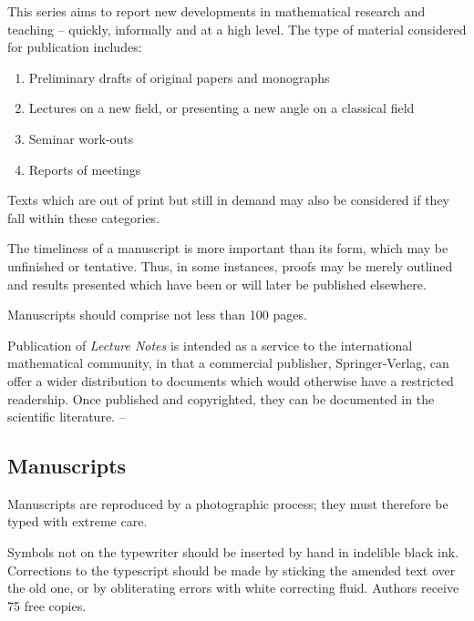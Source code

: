 
This series aims to report new developments in mathematical research and teaching -- quickly, informally
and at a high level. The type of material considered for publication includes:
\begin{enumerate}
\item Preliminary drafts of original papers and monographs
\item Lectures on a new field, or presenting a new angle on a classical field
\item Seminar work-outs
\item Reports of meetings
\end{enumerate}
Texts which are out of print but still in demand may also be considered if they fall within these categories.

The timeliness of a manuscript is more important than its form, which may be unfinished or tentative.
Thus, in some instances, proofs may be merely outlined and results presented which have been or will
later be published elsewhere.

Manuscripts should comprise not less than 100 pages.

Publication of \textit{Lecture Notes} is intended as a service to the international mathematical community, in
that a commercial publisher, Springer-Verlag, can offer a wider distribution to documents which would
otherwise have a restricted readership. Once published and copyrighted, they can be documented in the
scientific literature. --

\subsection*{Manuscripts}
Manuscripts are reproduced by a photographic process; they must therefore be typed with extreme care.

Symbols not on the typewriter should be inserted by hand in indelible black ink.
Corrections to the typescript should be made by sticking the amended text over
the old one, or by obliterating errors with white correcting fluid. Authors
receive 75 free copies.

